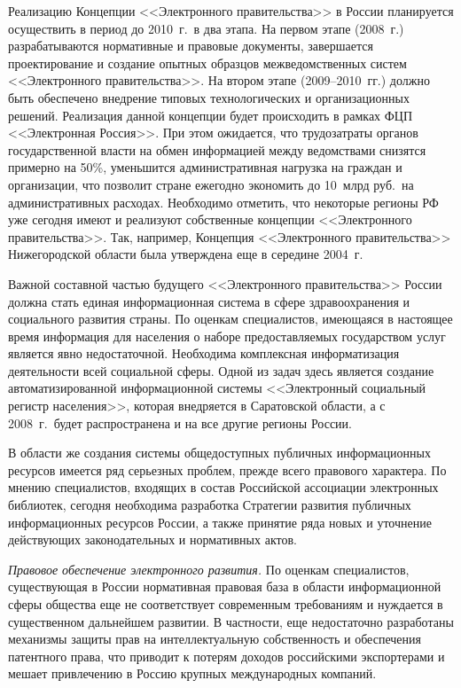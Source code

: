 \begin{multicols}{2}
     Реализацию Концепции <<Электронного правительства>> в России планируется
осуществить в период до 2010~г.\ в два этапа. На первом этапе (2008~г.) разрабатываются
нормативные и правовые документы, завершается проектирование и создание опытных
образцов межведомственных систем <<Электронного правительства>>. На втором этапе
(2009--2010~гг.) должно быть обеспечено внедрение типовых технологических и
организационных решений. Реализация данной концепции будет происходить в рамках
ФЦП <<Электронная Россия>>. При этом ожидается, что трудозатраты органов
государственной власти на обмен информацией между ведомствами снизятся примерно на
50\%, уменьшится административная нагрузка на граждан и организации, что позволит
стране ежегодно экономить до 10~млрд руб.\ на административных расходах. Необходимо
отметить, что некоторые регионы РФ уже сегодня имеют и реализуют собственные
концепции <<Электронного правительства>>. Так, например, Концепция <<Электронного
правительства>> Нижегородской области была утверждена еще в середине 2004~г.

     Важной составной частью будущего <<Электронного правительства>> России
должна стать единая информационная система в сфере здравоохранения и социального
развития страны. По оценкам специалистов, имеющаяся в настоящее время информация
для населения о наборе предоставляемых государством услуг является явно
недостаточной. Необходима комплексная информатизация деятельности всей социальной
сферы. Одной из задач здесь является создание автоматизированной информационной
системы <<Электронный социальный регистр населения>>, которая 
внедряется в Саратовской области, а с 2008~г.\ будет распространена и на все другие
регионы России.

     В области же создания системы общедоступных публичных информационных
ресурсов имеется ряд серьезных проблем, прежде всего правового характера. По мнению
специалистов, входящих в состав Российской ассоциации электронных библиотек,
сегодня необходима разработка Стратегии развития публичных информационных
ресурсов России, а также принятие ряда новых и уточнение действующих
законодательных и нормативных актов.

     \vspace*{1pt}
     \textit{Правовое обеспечение электронного развития.} По оценкам специалистов,
существующая в России нормативная правовая база в области информационной сферы
общества еще не соответствует совре\-мен\-ным требованиям и нуждается в существенном
дальнейшем развитии. В частности, еще %
недостаточно разработаны механизмы защиты
прав на интеллектуальную собственность и обеспечения патентного права, что приводит к
потерям доходов российскими экспортерами и мешает привлечению в Россию крупных
международных компаний.


\end{multicols}
